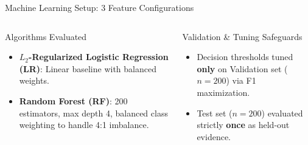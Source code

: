 \documentclass[10pt,aspectratio=169,xcolor={table,dvipsnames}]{beamer}
\begin{document}
\begin{frame}{Machine Learning Setup: 3 Feature Configurations}
  \vspace{0.25cm}
  \begin{columns}[c]
      \begin{exampleblock}{Algorithms Evaluated}
        \begin{itemize}\setlength{\itemsep}{2pt}
          \item \textbf{$L_2$-Regularized Logistic Regression (LR)}: Linear baseline with balanced weights.
          \item \textbf{Random Forest (RF)}: 200 estimators, max depth 4, balanced class weighting to handle 4:1 imbalance.
        \end{itemize}
      \end{exampleblock}

      \begin{alertblock}{Validation \& Tuning Safeguards}
        \begin{itemize}\setlength{\itemsep}{2pt}
          \item Decision thresholds tuned \textbf{only} on Validation set ($n=200$) via F1 maximization.
          \item Test set ($n=200$) evaluated strictly \textbf{once} as held-out evidence.
        \end{itemize}
      \end{alertblock}
  \end{columns}
\end{frame}
\end{document}
